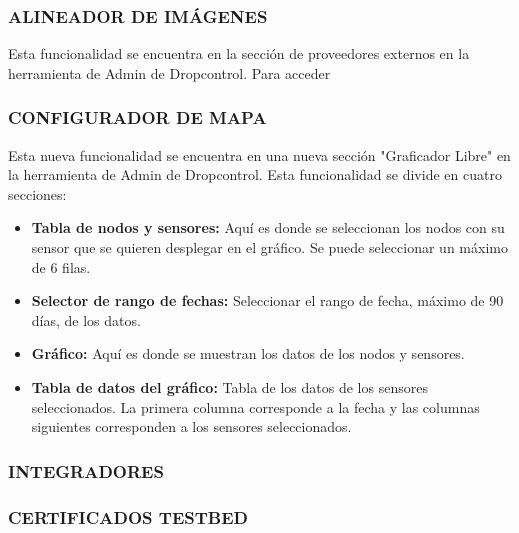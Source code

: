 \subsubsection{ALINEADOR DE IMÁGENES}

Esta funcionalidad se encuentra en la sección de proveedores externos en la herramienta de Admin de Dropcontrol. Para acceder 

\subsubsection{CONFIGURADOR DE MAPA}

Esta nueva funcionalidad se encuentra en una nueva sección "Graficador Libre" en la herramienta de Admin de Dropcontrol. Esta funcionalidad se divide en cuatro secciones:
\begin{itemize}
    \item \textbf{Tabla de nodos y sensores:} Aquí es donde se seleccionan los nodos con su sensor que se quieren desplegar en el gráfico. Se puede seleccionar un máximo de 6 filas. 
    \item \textbf{Selector de rango de fechas:} Seleccionar el rango de fecha, máximo de 90 días, de los datos.
    \item \textbf{Gráfico:} Aquí es donde se muestran los datos de los nodos y sensores.
    \item \textbf{Tabla de datos del gráfico:} Tabla de los datos de los sensores seleccionados. La primera columna corresponde a la fecha y las columnas siguientes corresponden a los sensores seleccionados.
\end{itemize}

\subsubsection{INTEGRADORES}

\subsubsection{CERTIFICADOS TESTBED}
